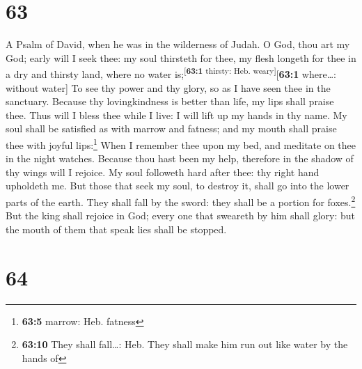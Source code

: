 \hypertarget{section-62}{%
\section{63}\label{section-62}}

A Psalm of David, when he was in the wilderness of Judah. 
O God, thou art my God; early will I seek thee: my soul thirsteth for
thee, my flesh longeth for thee in a dry and thirsty land, where no
water is;\textsuperscript{{[}\textbf{63:1} thirsty: Heb.
weary{]}}{[}\textbf{63:1} where\ldots: without water{]} 
To see thy power and thy glory, so as I have seen thee in the sanctuary.
 Because thy lovingkindness is better than life, my lips
shall praise thee.  Thus will I bless thee while I live: I
will lift up my hands in thy name.  My soul shall be
satisfied as with marrow and fatness; and my mouth shall praise thee
with joyful lips:\footnote{\textbf{63:5} marrow: Heb. fatness}
 When I remember thee upon my bed, and meditate on thee in
the night watches.  Because thou hast been my help,
therefore in the shadow of thy wings will I rejoice.  My
soul followeth hard after thee: thy right hand upholdeth me.
 But those that seek my soul, to destroy it, shall go into
the lower parts of the earth.  They shall fall by the
sword: they shall be a portion for foxes.\footnote{\textbf{63:10} They
  shall fall\ldots: Heb. They shall make him run out like water by the
  hands of}  But the king shall rejoice in God; every one
that sweareth by him shall glory: but the mouth of them that speak lies
shall be stopped.

\hypertarget{section-63}{%
\section{64}\label{section-63}}

